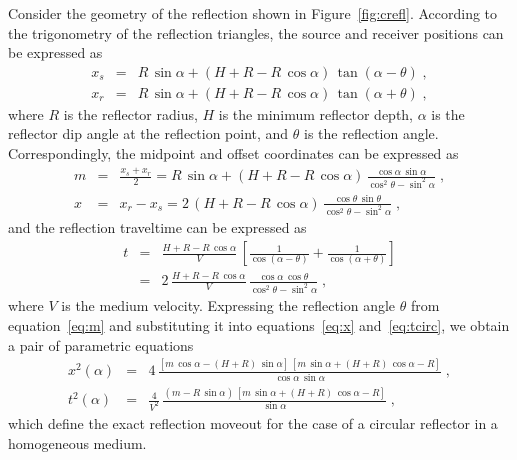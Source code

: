 Consider the geometry of the reflection shown in
Figure~\ref{fig:crefl}. According to the trigonometry of the
reflection triangles, the source and receiver positions can be expressed as
\begin{eqnarray}
\label{eq:xs}
x_s & = & R\,\sin{\alpha} + (H+R - R\,\cos{\alpha})\,\tan{(\alpha-\theta)}\;, \\
\label{eq:xr}
x_r & = & R\,\sin{\alpha} + (H+R - R\,\cos{\alpha})\,\tan{(\alpha+\theta)}\;,
\end{eqnarray}
where $R$ is the reflector radius, $H$ is the minimum reflector depth,
$\alpha$ is the reflector dip angle at the reflection point, and
$\theta$ is the reflection angle. Correspondingly, the midpoint and
offset coordinates can be expressed as
\begin{eqnarray}
\label{eq:m}
m & = & \frac{x_s+x_r}{2} = R\,\sin{\alpha} + (H+R - R\,\cos{\alpha})\,\frac{\cos{\alpha}\,\sin{\alpha}}{\cos^2{\theta} - \sin^2{\alpha}}\;, \\
\label{eq:x}
x & = & x_r - x_s = 2\,(H+R - R\,\cos{\alpha})\,\frac{\cos{\theta}\,\sin{\theta}}{\cos^2{\theta} - \sin^2{\alpha}}\;,
\end{eqnarray}
and the reflection traveltime can be expressed as
\begin{eqnarray}
\nonumber
t & = & \frac{H+R - R\,\cos{\alpha}}{V}\,\left[\frac{1}{\cos{(\alpha-\theta)}} + \frac{1}{\cos{(\alpha+\theta)}}\right] \\
& = & 2\,\frac{H+R - R\,\cos{\alpha}}{V}\,\frac{\cos{\alpha}\,\cos{\theta}}{\cos^2{\theta} - \sin^2{\alpha}}\;,
\label{eq:tcirc}
\end{eqnarray}
where $V$ is the medium velocity.
Expressing the reflection angle $\theta$ from equation~\ref{eq:m} and
substituting it into equations~\ref{eq:x} and~\ref{eq:tcirc}, we obtain a
pair of parametric equations
\begin{eqnarray}
\label{eq:xa}
x^2(\alpha) & = & 4\,\frac{[m\,\cos{\alpha} - (H+R)\,\sin{\alpha}]\,[m\,\sin{\alpha} + (H+R)\,\cos{\alpha} - R]}{\cos{\alpha}\,\sin{\alpha}}\;, \\
\label{eq:ta}
t^2(\alpha) & = & \frac{4}{V^2}\,\frac{(m - R\,\sin{\alpha})\,[m\,\sin{\alpha} + (H+R)\,\cos{\alpha} - R]}{\sin{\alpha}}\;,
\end{eqnarray}
which define the exact reflection moveout for the case of a circular reflector in a homogeneous medium.

